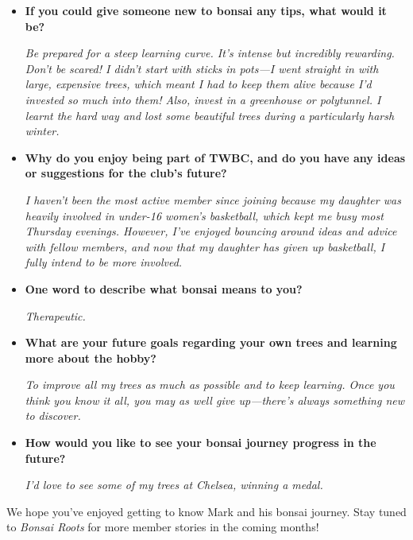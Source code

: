 \begin{itemize}
    \emph{I've always found bonsai beautiful, but what really captured me was the skill involved. I'm a model maker and hairdresser by trade, and bonsai is like a blend of those two worlds. Manipulating nature---it's crazy stuff!}

    \item \textbf{If you could give someone new to bonsai any tips, what would it be?}
    
    \emph{Be prepared for a steep learning curve. It's intense but incredibly rewarding. Don't be scared! I didn't start with sticks in pots---I went straight in with large, expensive trees, which meant I had to keep them alive because I'd invested so much into them! Also, invest in a greenhouse or polytunnel. I learnt the hard way and lost some beautiful trees during a particularly harsh winter.}

    \item \textbf{Why do you enjoy being part of TWBC, and do you have any ideas or suggestions for the club's future?}
    
    \emph{I haven't been the most active member since joining because my daughter was heavily involved in under-16 women's basketball, which kept me busy most Thursday evenings. However, I've enjoyed bouncing around ideas and advice with fellow members, and now that my daughter has given up basketball, I fully intend to be more involved.}

    \item \textbf{One word to describe what bonsai means to you?}
    
    \emph{Therapeutic.}

    \item \textbf{What are your future goals regarding your own trees and learning more about the hobby?}
    
    \emph{To improve all my trees as much as possible and to keep learning. Once you think you know it all, you may as well give up---there's always something new to discover.}

    \item \textbf{How would you like to see your bonsai journey progress in the future?}
    
    \emph{I'd love to see some of my trees at Chelsea, winning a medal.}
\end{itemize}

We hope you've enjoyed getting to know Mark and his bonsai journey.
Stay tuned to \emph{Bonsai Roots} for more member stories in the coming months!

\closearticle
